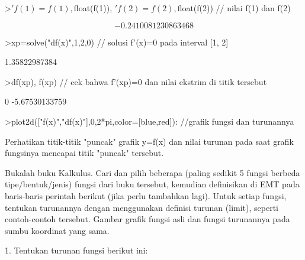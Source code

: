 \documentclass{article}
\begin{document}
\begin{eulernotebook}
\begin{eulercomment}
\begin{eulercomment}
\begin{euleroutput}
\end{euleroutput}
\begin{eulerprompt}
>$'f(1)=f(1), $float(f(1)), $'f(2)=f(2), $float(f(2)) // nilai f(1) dan f(2)
\end{eulerprompt}
\begin{eulerformula}
\[
-0.2410081230863468
\]
\end{eulerformula}
\begin{eulerprompt}
>xp=solve("df(x)",1,2,0) // solusi f'(x)=0 pada interval [1, 2]
\end{eulerprompt}
\begin{euleroutput}
  1.35822987384
\end{euleroutput}
\begin{eulerprompt}
>df(xp), f(xp) // cek bahwa f'(xp)=0 dan nilai ekstrim di titik tersebut
\end{eulerprompt}
\begin{euleroutput}
  0
  -5.67530133759
\end{euleroutput}
\begin{eulerprompt}
>plot2d(["f(x)","df(x)"],0,2*pi,color=[blue,red]): //grafik fungsi dan turunannya
\end{eulerprompt}
\begin{eulercomment}
Perhatikan titik-titik "puncak" grafik y=f(x) dan nilai turunan pada
saat grafik fungsinya mencapai titik "puncak" tersebut.

\begin{eulercomment}
\begin{eulercomment}
Bukalah buku Kalkulus. Cari dan pilih beberapa (paling sedikit 5
fungsi berbeda tipe/bentuk/jenis) fungsi dari buku tersebut, kemudian
definisikan di EMT pada baris-baris perintah berikut (jika perlu
tambahkan lagi). Untuk setiap fungsi, tentukan turunannya dengan
menggunakan definisi turunan (limit), seperti contoh-contoh tersebut.
Gambar grafik fungsi asli dan fungsi turunannya pada sumbu koordinat
yang sama.

1. Tentukan turunan fungsi berikut ini:


\end{eulercomment}
\end{eulercomment}
\end{eulercomment}
\end{eulercomment}
\end{eulercomment}
\end{eulernotebook}
\end{document}

